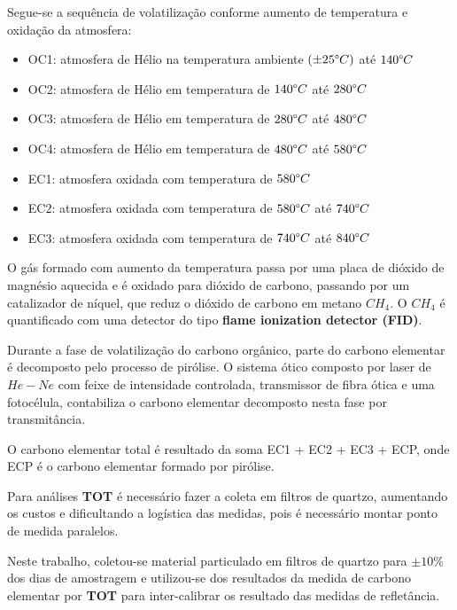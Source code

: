 Segue-se a sequência de volatilização conforme aumento de temperatura e 
oxidação da atmosfera:

\begin{itemize}
  \item OC1: atmosfera de Hélio na temperatura ambiente $(\pm 25 \degree C)$ até $140 \degree C$
  \item OC2: atmosfera de Hélio em temperatura de $140 \degree C$ até $280 \degree C$
  \item OC3: atmosfera de Hélio em temperatura de $280 \degree C$ até $480 \degree C$
  \item OC4: atmosfera de Hélio em temperatura de $480 \degree C$ até $580 \degree C$
  \item EC1: atmosfera oxidada com temperatura de $580 \degree C$
  \item EC2: atmosfera oxidada com temperatura de $580 \degree C$ até $740 \degree C$
  \item EC3: atmosfera oxidada com temperatura de $740 \degree C$ até $840 \degree C$
\end{itemize}

O gás formado com aumento da temperatura passa por uma placa de dióxido de magnésio 
aquecida e é oxidado para dióxido de carbono, passando por um catalizador de níquel, 
que reduz o dióxido de carbono em metano $CH_4$.
O $CH_4$ é quantificado com uma detector do tipo 
\textbf{flame ionization detector (FID)}.

Durante a fase de volatilização do carbono orgânico, parte do carbono elementar
é decomposto pelo processo de pirólise. 
O sistema ótico composto por laser de $He-Ne$ com feixe de intensidade controlada, 
transmissor de fibra ótica e uma fotocélula, contabiliza o carbono elementar
decomposto nesta fase por transmitância.

O carbono elementar total é resultado da soma EC1 + EC2 + EC3 + ECP,
onde ECP é o carbono elementar formado por pirólise. 

Para análises \textbf{TOT} é necessário fazer a coleta em filtros
de quartzo, aumentando os custos e dificultando a logística das medidas, 
pois é necessário montar ponto de medida paralelos.  

Neste trabalho, coletou-se material particulado em filtros de 
quartzo para $\pm 10\%$ dos dias de amostragem e utilizou-se
dos resultados da medida de carbono elementar por \textbf{TOT} 
para inter-calibrar os resultado das medidas de refletância. 
